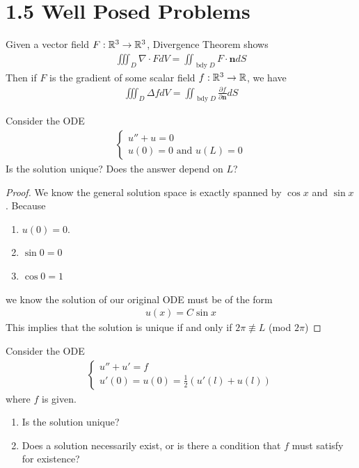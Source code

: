 \documentclass{report}
\begin{document}
\section{1.5 Well Posed Problems}
\begin{mdframed}
Given a vector field $F:\mathbb{R}^3\rightarrow \mathbb{R}^3$, Divergence Theorem shows
\begin{align*}
\iiint_D \nabla \cdot F dV =\iint_{\operatorname{bdy}D} F\cdot \textbf{n}dS
\end{align*}
Then if $F$ is the gradient of some scalar field   $f:\mathbb{R}^3\rightarrow \mathbb{R}$, we have 
\begin{align*}
\iiint_D \Delta f dV=\iint_{\operatorname{bdy}D} \frac{\partial f}{\partial \textbf{n}}dS
\end{align*}
\end{mdframed}
\begin{question}{}{}
Consider the ODE
\begin{align*}
\begin{cases}
  u''+u=0\\
  u(0)=0\text{ and }u(L)=0
\end{cases} 
\end{align*}
Is the solution unique? Does the answer depend on $L$? 
\end{question}
\begin{proof}
We know the general solution space is exactly spanned by $\cos x$ and $\sin x$. Because 
\begin{enumerate}[label=(\alph*)]
  \item $u(0)=0$.
  \item $\sin 0=0$
  \item $\cos 0=1$
\end{enumerate}
we know the solution of our original ODE must be of the form 
\begin{align*}
u(x)=C \sin x
\end{align*}
This implies that the solution is unique if and only if $2\pi \not\equiv L$ (mod $2\pi$)
\end{proof}
\begin{question}{}{}
Consider the ODE 
\begin{align*}
\begin{cases}
  u''+u'=f \\
  u'(0)=u(0)=\frac{1}{2}(u'(l)+u(l))
\end{cases}
\end{align*}
where $f$ is given. 
\begin{enumerate}[label=(\alph*)]
  \item Is the solution unique? 
  \item Does a solution necessarily exist, or is there a condition that $f$ must satisfy for existence? 
\end{enumerate}
\end{question}
\end{document}
